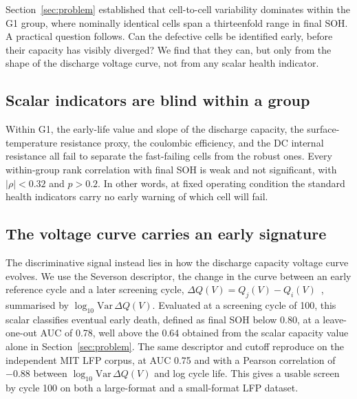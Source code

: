 Section~\ref{sec:problem} established that cell-to-cell variability dominates within the G1
group, where nominally identical cells span a thirteenfold range in final SOH. A practical
question follows. Can the defective cells be identified early, before their capacity has visibly
diverged? We find that they can, but only from the shape of the discharge voltage curve, not from
any scalar health indicator.

\subsection{Scalar indicators are blind within a group}\label{sec:screen_scalar}
Within G1, the early-life value and slope of the discharge capacity, the surface-temperature
resistance proxy, the coulombic efficiency, and the DC internal resistance all fail to separate
the fast-failing cells from the robust ones. Every within-group rank correlation with final SOH
is weak and not significant, with $|\rho|<0.32$ and $p>0.2$. In other words, at fixed operating
condition the standard health indicators carry no early warning of which cell will fail.

\subsection{The voltage curve carries an early signature}\label{sec:screen_dqv}
The discriminative signal instead lies in how the discharge capacity voltage curve evolves. We
use the Severson descriptor, the change in the curve between an early reference cycle and a later
screening cycle, $\Delta Q(V)=Q_{j}(V)-Q_{i}(V)$~\cite{severson2019data}, summarised by
$\log_{10}\mathrm{Var}\,\Delta Q(V)$. Evaluated at a screening cycle of 100, this scalar
classifies eventual early death, defined as final SOH below 0.80, at a leave-one-out AUC of 0.78,
well above the 0.64 obtained from the scalar capacity value alone in Section~\ref{sec:problem}.
The same descriptor and cutoff reproduce on the independent MIT LFP corpus, at AUC 0.75 and with a
Pearson correlation of $-0.88$ between $\log_{10}\mathrm{Var}\,\Delta Q(V)$ and log cycle life.
This gives a usable screen by cycle 100 on both a large-format and a small-format LFP dataset.

